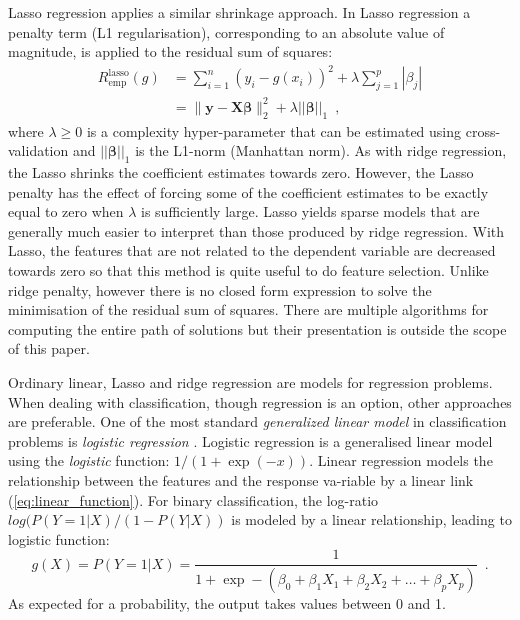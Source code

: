 Lasso regression applies a similar shrinkage approach. In Lasso regression a penalty term (L1 regularisation), corresponding to an absolute value of magnitude, is applied to the residual sum of squares:
\begin{equation*}
\begin{aligned}
    R_\mathrm{emp}^\mathrm{lasso}(g) & = \sum_{i=1}^{n}(y_i -g(x_i))^2 + \lambda\sum_{j=1}^{p}|\beta_{j}| \\
& = \|\mathbf{y} - \mathbf{X}\boldsymbol{\beta}\|_2^2 + \lambda||\boldsymbol{\beta}||_1
    \enspace,
\end{aligned}
\end{equation*}
where $\lambda \geq 0 $ is a complexity hyper-parameter that can be estimated using cross-validation and $||\boldsymbol{\beta}||_1$ is the L1-norm (Manhattan norm). As with ridge regression, the Lasso shrinks the coefficient estimates towards zero. However, the Lasso penalty has the effect of forcing some of the coefficient estimates to be exactly equal to zero when $\lambda$ is sufficiently large. Lasso yields sparse models that are generally much easier to interpret than those produced by ridge regression. With Lasso, the features that are not related to the dependent variable are decreased towards zero so that this method is quite useful to do feature selection. Unlike ridge penalty, however there is no closed form expression to solve the minimisation of the residual sum of squares. There are multiple algorithms for computing the entire path of solutions but their presentation is outside the scope of this paper. 

Ordinary linear, Lasso and ridge regression are models for regression problems. When dealing with classification, though regression is an option, other approaches are preferable. One of the most standard \textit{generalized linear model} in classification problems is \textit{logistic regression}  \citep{friedman2017elements}. Logistic regression is a generalised linear model using the \textit{logistic} function: ${1}/(1 + \exp(-x))$. 
Linear regression models the relationship between the  features and the response va-riable by a linear link (\ref{eq:linear_function}). For binary classification, the log-ratio $log(P(Y=1|X)/(1-P(Y|X))$ is modeled by a linear relationship, leading to logistic function:
\begin{equation*}
    g(X)=P(Y=1|X) = \frac{1}{1 + \exp- (\beta_0 + \beta_1X_1 + \beta_2X_2 + \ldots + \beta_pX_p) }
    \enspace.
\end{equation*}
As expected for a probability, the output takes values between 0 and 1.


